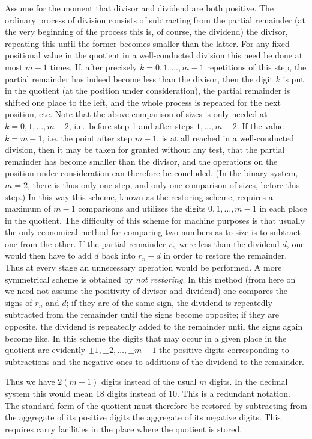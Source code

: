 \documentclass[12pt]{amsart}
\begin{document}
Assume for the moment that divisor and dividend are both positive. The ordinary process of division consists of subtracting from the partial remainder (at the very beginning of the process this is, of course, the dividend) the divisor, repeating this until the former becomes smaller than the latter. For any fixed positional value in the quotient in a well-conducted division this need be done at most $m - 1$ times. If, after precisely $k = 0, 1, \dots, m - 1$ repetitions of this step, the partial remainder has indeed become less than the divisor, then the digit $k$ is put in the quotient (at the position under consideration), the partial remainder is shifted one place to the left, and the whole process is repeated for the next position, etc. Note that the above comparison of sizes is only needed at $k = 0, 1, \dots, m - 2$, i.e.\ before step 1 and after steps $1, \dots, m- 2$. If the value $k = m - 1$, i.e. the point after step $m - 1$, is at all reached in a well-conducted division, then it may be taken for granted without any test, that the partial remainder has become smaller than the divisor, and the operations on the position under consideration can therefore be concluded. (In the binary system, $m = 2$, there is thus only one step, and only one comparison of sizes, before this step.) In this way this scheme, known as the restoring scheme, requires a maximum of $m - 1$ comparisons and utilizes the digits $0, 1, \dots, m - 1$ in each place in the quotient. The difficulty of this scheme for machine purposes is that usually the only economical method for comparing two numbers as to size is to subtract one from the other. If the partial remainder $r_n$ were less than the dividend $d$, one would then have to add $d$ back into $r_n - d$ in order to restore the remainder. Thus at every stage an unnecessary operation would be performed. A more symmetrical scheme is obtained by \emph{not restoring}. In this method (from here on we need not assume the positivity of divisor and dividend) one compares the signs of $r_n$ and $d$; if they are of the same sign, the dividend is repeatedly subtracted from the remainder until the signs become opposite; if they are opposite, the dividend is repeatedly added to the remainder until the signs again become like. In this scheme the digits that may occur in a given place in the quotient are evidently $\pm 1, \pm 2, \dots, \pm{m - 1}$ the positive digits corresponding to subtractions and the negative ones to additions of the dividend to the remainder.

Thus we have $2(m - 1)$ digits instead of the usual $m$ digits. In the decimal system this would mean 18 digits instead of 10. This is a redundant notation. The standard form of the quotient must therefore be restored by subtracting from the aggregate of its positive digits the aggregate of its negative digits. This requires carry facilities in the place where the quotient is stored.
\end{document}
